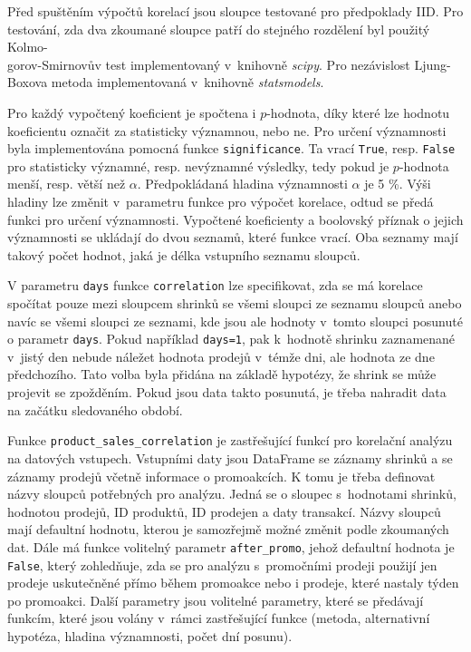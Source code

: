 Před spuštěním výpočtů korelací jsou sloupce testované pro předpoklady IID. Pro testování, zda dva zkoumané sloupce patří do stejného rozdělení byl použitý Kolmo-\\gorov-Smirnovův test implementovaný v~knihovně \emph{scipy}. Pro nezávislost Ljung-Boxova metoda implementovaná v~knihovně \emph{statsmodels}.

Pro každý vypočtený koeficient je spočtena i $p$-hodnota, díky které lze hodnotu koeficientu označit za statisticky významnou, nebo ne. Pro určení významnosti byla implementována pomocná funkce \texttt{significance}. Ta vrací \texttt{True}, resp. \texttt{False} pro statisticky významné, resp. nevýznamné výsledky, tedy pokud je $p$-hodnota menší, resp. větší než $\alpha$. Předpokládaná hladina významnosti $\alpha$ je 5 \%. Výši hladiny lze změnit v~parametru funkce pro výpočet korelace, odtud se předá funkci pro určení významnosti. Vypočtené koeficienty a boolovský příznak o jejich významnosti se ukládají do dvou seznamů, které funkce vrací. Oba seznamy mají takový počet hodnot, jaká je délka vstupního seznamu sloupců.

V parametru \texttt{days} funkce \texttt{correlation} lze specifikovat, zda se má  korelace spočítat pouze mezi sloupcem shrinků se všemi sloupci ze seznamu sloupců anebo navíc se všemi sloupci ze seznami, kde jsou ale hodnoty v~tomto sloupci posunuté o parametr \texttt{days}. Pokud například \texttt{days=1}, pak k~hodnotě shrinku zaznamenané v~jistý den nebude náležet hodnota prodejů v~témže dni, ale hodnota ze dne předchozího. Tato volba byla přidána na základě hypotézy, že shrink se může projevit se zpožděním. Pokud jsou data takto posunutá, je třeba nahradit data na začátku sledovaného období. 

Funkce \texttt{product\_sales\_correlation} je zastřešující funkcí pro korelační analýzu na datových vstupech. Vstupními daty jsou DataFrame se záznamy shrinků a se záznamy prodejů včetně informace o promoakcích. K tomu je třeba definovat názvy  sloupců potřebných pro analýzu. Jedná se o sloupec s~hodnotami shrinků, hodnotou prodejů, ID produktů, ID prodejen a daty transakcí. Názvy sloupců mají defaultní hodnotu, kterou je samozřejmě možné změnit podle zkoumaných dat. Dále má funkce volitelný parametr \texttt{after\_promo}, jehož defaultní hodnota je \texttt{False}, který zohledňuje, zda se pro analýzu s~promočními prodeji použijí jen prodeje uskutečněné přímo během promoakce nebo i prodeje, které nastaly týden po promoakci. Další parametry jsou volitelné parametry, které se předávají funkcím, které jsou volány v~rámci zastřešující funkce (metoda, alternativní hypotéza, hladina významnosti, počet dní posunu). 

